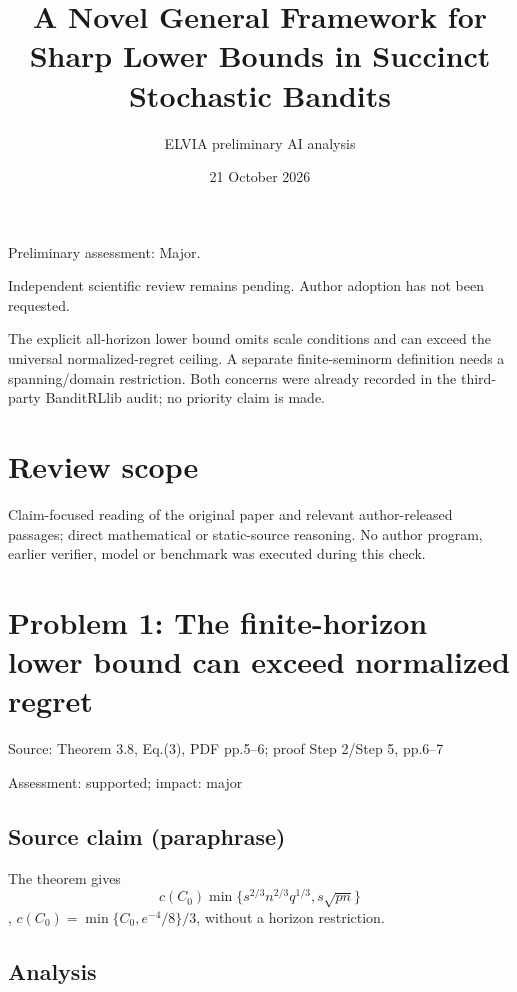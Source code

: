 \documentclass[11pt]{article}
\begin{document}
\title{A Novel General Framework for Sharp Lower Bounds in Succinct Stochastic Bandits}

\author{ELVIA preliminary AI analysis}\date{21 October 2026}\maketitle

Preliminary assessment: Major.\par

Independent scientific review remains pending. Author adoption has not been requested.

The explicit all-horizon lower bound omits scale conditions and can exceed the universal normalized-regret ceiling. A separate finite-seminorm definition needs a spanning/domain restriction. Both concerns were already recorded in the third-party BanditRLlib audit; no priority claim is made.

\section*{Review scope}

Claim-focused reading of the original paper and relevant author-released passages; direct mathematical or static-source reasoning. No author program, earlier verifier, model or benchmark was executed during this check.

\section*{Problem 1: The finite-horizon lower bound can exceed normalized regret}

Source: Theorem 3.8, Eq.(3), PDF pp.5–6; proof Step 2/Step 5, pp.6–7

Assessment: supported; impact: major

\subsection*{Source claim (paraphrase)}

The theorem gives \[c(C_0)\min\{s^{2/3}n^{2/3}q^{1/3},s\sqrt{pn}\}\], \(c(C_0)=\min\{C_0,e^{-4}/8\}/3\), without a horizon restriction.

\subsection*{Analysis}
\end{document}
